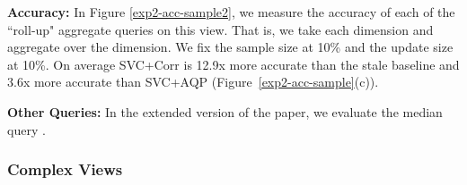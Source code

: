 \textbf{Accuracy: }
In Figure \ref{exp2-acc-sample2}, we measure the accuracy of each of the ``roll-up" aggregate queries on this view.
That is, we take each dimension and aggregate over the dimension.
We fix the sample size at 10\% and the update size at 10\%.
On average SVC+Corr is 12.9x more accurate than the stale baseline and 3.6x more accurate than SVC+AQP (Figure~\ref{exp2-acc-sample}(c)). 


\textbf{Other Queries: } In the extended version of the paper, we evaluate the median query .

\subsubsection{Complex Views}

